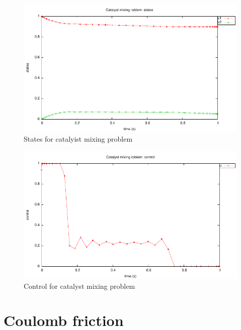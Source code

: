 \documentclass[a4paper,11pt]{report}    %
\begin{document}
\begin{figure}
  \centering 
  \includegraphics{../examples/catmix/catmix_states}
  \caption{States for catalyist mixing problem}
 \label{fig:catmix_states}
\end{figure}


\begin{figure}
  \centering
  \includegraphics{../examples/catmix/catmix_control}
  \caption{Control for catalyst mixing problem}
 \label{fig:catmix_control}
\end{figure}


\section{Coulomb friction}
\end{document}
